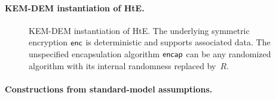 \paragraph{KEM-DEM instantiation of HtE.} 

\begin{figure}[tbhp]
\begin{center}
%
\caption{KEM-DEM instantiation of HtE.  The underlying symmetric encryption ${\mathsf{enc}}$ is deterministic and supports associated data. The unspecified encapsulation algorithm $\mathsf{encap}$ can be any randomized algorithm with its internal randomness replaced by~$R$.  
}
\label{fig:kem-dem-HtE}
\end{center}
\end{figure}

\paragraph{Constructions from standard-model assumptions. } 


